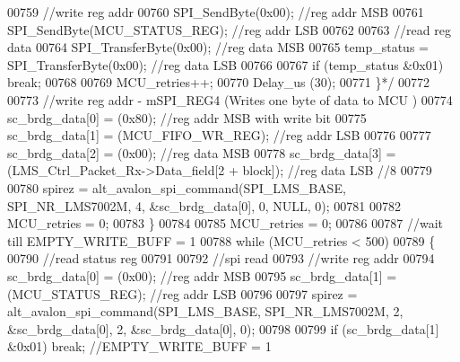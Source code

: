 \begin{DoxyCode}
00759 \textcolor{comment}{                            //write reg addr}
00760 \textcolor{comment}{                            SPI\_SendByte(0x00); //reg addr MSB}
00761 \textcolor{comment}{                            SPI\_SendByte(MCU\_STATUS\_REG); //reg addr LSB}
00762 \textcolor{comment}{}
00763 \textcolor{comment}{                            //read reg data}
00764 \textcolor{comment}{                            SPI\_TransferByte(0x00); //reg data MSB}
00765 \textcolor{comment}{                            temp\_status = SPI\_TransferByte(0x00); //reg data LSB}
00766 \textcolor{comment}{}
00767 \textcolor{comment}{                            if (temp\_status &0x01) break;}
00768 \textcolor{comment}{}
00769 \textcolor{comment}{                            MCU\_retries++;}
00770 \textcolor{comment}{                            Delay\_us (30);}
00771 \textcolor{comment}{                        \}*/}
00772 
00773                         \textcolor{comment}{//write reg addr - mSPI\_REG4 (Writes one byte of data to MCU  )}
00774                         sc_brdg_data[0] = (0x80); \textcolor{comment}{//reg addr MSB with write bit}
00775                         sc_brdg_data[1] = (MCU_FIFO_WR_REG); \textcolor{comment}{//reg addr LSB}
00776 
00777                         sc_brdg_data[2] = (0x00); \textcolor{comment}{//reg data MSB}
00778                         sc_brdg_data[3] = (LMS\_Ctrl\_Packet\_Rx->Data_field[2 + 
      block]); \textcolor{comment}{//reg data LSB //8}
00779 
00780                         spirez = alt_avalon_spi_command(SPI_LMS_BASE, 
      SPI_NR_LMS7002M, 4, &sc_brdg_data[0], 0, NULL, 0);
00781 
00782                         MCU_retries = 0;
00783                     \}
00784 
00785                     MCU_retries = 0;
00786 
00787                     \textcolor{comment}{//wait till EMPTY\_WRITE\_BUFF = 1}
00788                     \textcolor{keywordflow}{while} (MCU_retries < 500)
00789                     \{
00790                         \textcolor{comment}{//read status reg}
00791 
00792                         \textcolor{comment}{//spi read}
00793                         \textcolor{comment}{//write reg addr}
00794                         sc_brdg_data[0] = (0x00); \textcolor{comment}{//reg addr MSB}
00795                         sc_brdg_data[1] = (MCU_STATUS_REG); \textcolor{comment}{//reg addr LSB}
00796 
00797                         spirez = alt_avalon_spi_command(SPI_LMS_BASE, 
      SPI_NR_LMS7002M, 2, &sc_brdg_data[0], 2, &sc_brdg_data[0], 0);
00798 
00799                         \textcolor{keywordflow}{if} (sc_brdg_data[1] &0x01) \textcolor{keywordflow}{break}; \textcolor{comment}{//EMPTY\_WRITE\_BUFF = 1}

\end{DoxyCode}
